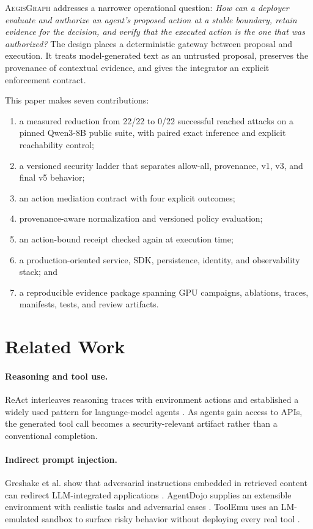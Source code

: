 \documentclass[10pt,twocolumn]{article}
\newcommand{\system}{\textsc{AegisGraph}\xspace}
\begin{document}
\system addresses a narrower operational question: \emph{How can a deployer evaluate and authorize an agent's proposed action at a stable boundary, retain evidence for the decision, and verify that the executed action is the one that was authorized?} The design places a deterministic gateway between proposal and execution. It treats model-generated text as an untrusted proposal, preserves the provenance of contextual evidence, and gives the integrator an explicit enforcement contract.

This paper makes seven contributions:
\begin{enumerate}
  \item a measured reduction from 22/22 to 0/22 successful reached attacks on a pinned Qwen3-8B public suite, with paired exact inference and explicit reachability control;
  \item a versioned security ladder that separates allow-all, provenance, v1, v3, and final v5 behavior;
  \item an action mediation contract with four explicit outcomes;
  \item provenance-aware normalization and versioned policy evaluation;
  \item an action-bound receipt checked again at execution time;
  \item a production-oriented service, SDK, persistence, identity, and observability stack; and
  \item a reproducible evidence package spanning GPU campaigns, ablations, traces, manifests, tests, and review artifacts.
\end{enumerate}

\section{Related Work}
\paragraph{Reasoning and tool use.} ReAct interleaves reasoning traces with environment actions and established a widely used pattern for language-model agents \cite{yao2023react}. As agents gain access to APIs, the generated tool call becomes a security-relevant artifact rather than a conventional completion.

\paragraph{Indirect prompt injection.} Greshake et al. show that adversarial instructions embedded in retrieved content can redirect LLM-integrated applications \cite{greshake2023indirect}. AgentDojo supplies an extensible environment with realistic tasks and adversarial cases \cite{debenedetti2024agentdojo}. ToolEmu uses an LM-emulated sandbox to surface risky behavior without deploying every real tool \cite{ruan2023toolemu}.
\end{document}
